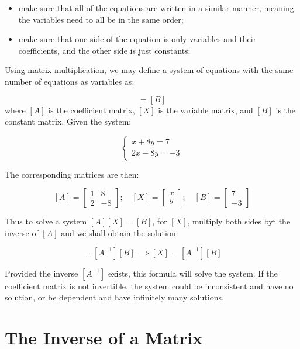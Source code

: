 \begin{itemize}
\tightlist
\item
  make sure that all of the equations are written in a similar manner,
  meaning the variables need to all be in the same order;
\item
  make sure that one side of the equation is only variables and their
  coefficients, and the other side is just constants;
\end{itemize}

Using matrix multiplication, we may define a
system of equations with the same number of equations as variables as:

\begin{equation} [A][X] = [B]\end{equation}
where \([A]\) is the coefficient matrix, \([X]\) is the variable matrix, and
\([B]\) is the constant matrix. Given the system:

\[
\begin{cases}
x + 8y = 7 \\
2x -8y = -3
\end{cases}
\]

The corresponding matrices are then:

\[[A]=
\begin{bmatrix}
1 & 8\\
2 & -8
\end{bmatrix}
;\quad
[X]=
\begin{bmatrix}
x\\
y
\end{bmatrix}
;\quad
[B]=
\begin{bmatrix}
7\\
-3
\end{bmatrix}
\]

Thus to solve a system $[A][X]=[B]$, for $[X]$, multiply both sides byt the inverse of $[A]$ and 
we shall obtain the solution:

\begin{equation}[A^{-1}][A][X]=[A^{-1}][B] \implies [X] = [A^{-1}][B] \end{equation}

Provided the inverse \([A^{-1}]\) exists, this formula will solve the
system. If the coefficient matrix is not invertible, the system could be
inconsistent and have no solution, or be dependent and have infinitely
many solutions.

 \section{The Inverse of a Matrix}\label{the-inverse-of-a-matrix}

